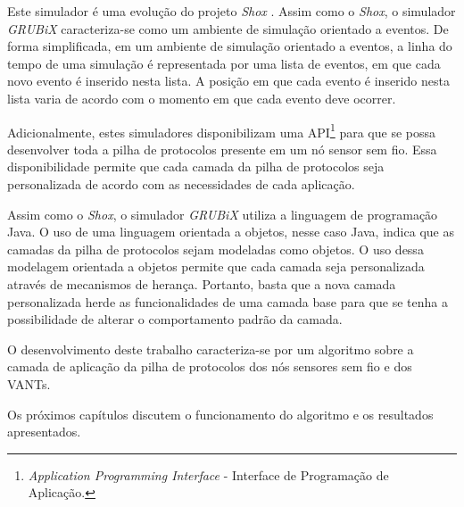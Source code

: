 Este simulador é uma evolução do projeto \emph{Shox} \cite{shox}. Assim como o \emph{Shox}, o simulador \emph{GRUBiX} caracteriza-se como um ambiente de simulação orientado a eventos. De forma simplificada, em um ambiente de simulação orientado a eventos, a linha do tempo de uma simulação é representada por uma lista de eventos, em que cada novo evento é inserido nesta lista. A posição em que cada evento é inserido nesta lista varia de acordo com o momento em que cada evento deve ocorrer.

Adicionalmente, estes simuladores disponibilizam uma API\footnote{\emph{Application Programming Interface} - Interface de Programação de Aplicação.} para que se possa desenvolver toda a pilha de protocolos presente em um nó sensor sem fio. Essa disponibilidade permite que cada camada da pilha de protocolos seja personalizada de acordo com as necessidades de cada aplicação.

Assim como o \emph{Shox}, o simulador \emph{GRUBiX} utiliza a linguagem de programação Java. O uso de uma linguagem orientada a objetos, nesse caso Java, indica que as camadas da pilha de protocolos sejam modeladas como objetos. O uso dessa modelagem orientada a objetos permite que cada camada seja personalizada através de mecanismos de herança. Portanto, basta que a nova camada personalizada herde as funcionalidades de uma camada base para que se tenha a possibilidade de alterar o comportamento padrão da camada.


O desenvolvimento deste trabalho caracteriza-se por um algoritmo sobre a camada de aplicação da pilha de protocolos dos nós sensores sem fio e dos VANTs.

Os próximos capítulos discutem o funcionamento do algoritmo e os resultados apresentados.




